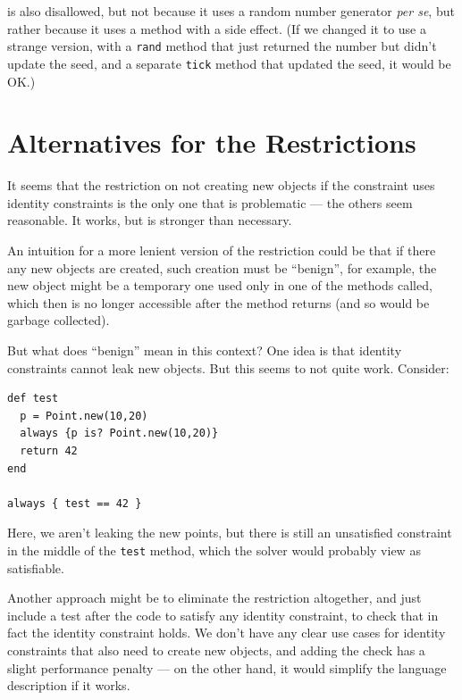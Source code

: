 \documentclass{article}
\begin{document}
is also disallowed, but not because it uses a random number generator
\emph{per se}, but rather because it uses a method with a side effect.
(If we changed it to use a strange version, with a \verb|rand| method
that just returned the number but didn't update the seed, and a
separate \verb|tick| method that updated the seed, it would be OK.)

\section{Alternatives for the Restrictions}
\label{sec:alternatives}

It seems that the restriction on not creating new objects if the
constraint uses identity constraints is the only one that is
problematic --- the others seem reasonable.  It works, but is stronger
than necessary.

An intuition for a more lenient version of the restriction could be
that if there any new objects are created, such creation must be
``benign'', for example, the new object might be a temporary one used
only in one of the methods called, which then is no longer accessible
after the method returns (and so would be garbage collected).

But what does ``benign'' mean in this context?  One idea is that
identity constraints cannot leak new objects.  But this seems to not
quite work.  Consider:

\begin{verbatim}
def test
  p = Point.new(10,20)
  always {p is? Point.new(10,20)}
  return 42
end

always { test == 42 }
\end{verbatim}

Here, we aren't leaking the new points, but there is still an
unsatisfied constraint in the middle of the \verb|test| method, which
the solver would probably view as satisfiable.

Another approach might be to eliminate the restriction altogether, and
just include a test after the code to satisfy any identity constraint,
to check that in fact the identity constraint holds.  We don't have
any clear use cases for identity constraints that also need to create
new objects, and adding the check has a slight performance penalty ---
on the other hand, it would simplify the language description if it
works.




\end{document}
